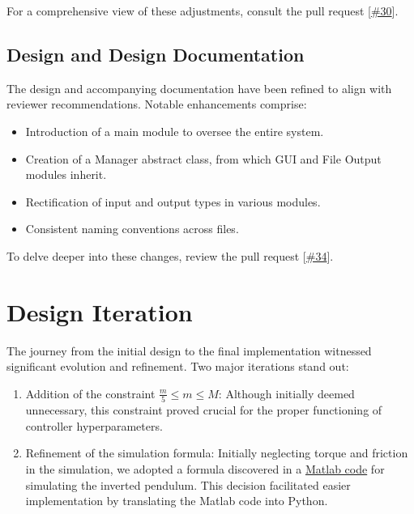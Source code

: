 \documentclass{article}
\begin{document}
For a comprehensive view of these adjustments, consult the pull request [\href{https://github.com/mirzaim/ipcs/pull/30}{\#30}].

\subsection{Design and Design Documentation}

The design and accompanying documentation have been refined to align with reviewer recommendations. Notable enhancements comprise:

\begin{itemize}
    \item Introduction of a main module to oversee the entire system.
    \item Creation of a Manager abstract class, from which GUI and File Output modules inherit.
    \item Rectification of input and output types in various modules.
    \item Consistent naming conventions across files.
\end{itemize}

To delve deeper into these changes, review the pull request [\href{https://github.com/mirzaim/ipcs/pull/34}{\#34}].

\section{Design Iteration}

The journey from the initial design to the final implementation witnessed significant evolution and refinement. Two major iterations stand out:

\begin{enumerate}
    \item Addition of the constraint $\frac{m}{5} \leq m \leq M$: Although initially deemed unnecessary, this constraint proved crucial for the proper functioning of controller hyperparameters.
    \item Refinement of the simulation formula: Initially neglecting torque and friction in the simulation, we adopted a formula discovered in a \href{https://github.com/jitendra825/Inverted-Pendulum-Simulink}{Matlab code} for simulating the inverted pendulum. This decision facilitated easier implementation by translating the Matlab code into Python.
\end{enumerate}
\end{document}

